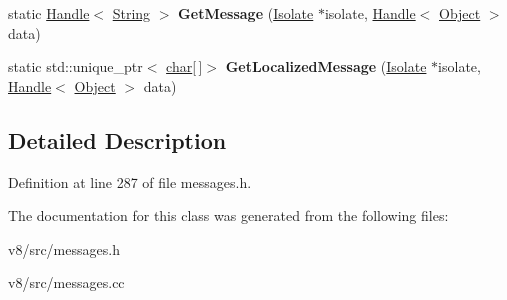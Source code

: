 \begin{DoxyCompactItemize}
\item 
\mbox{\label{classv8_1_1internal_1_1MessageHandler_a05c7290090b9628721213d335da8813c}} 
static \mbox{\hyperlink{classv8_1_1internal_1_1Handle}{Handle}}$<$ \mbox{\hyperlink{classv8_1_1internal_1_1String}{String}} $>$ {\bfseries Get\+Message} (\mbox{\hyperlink{classv8_1_1internal_1_1Isolate}{Isolate}} $\ast$isolate, \mbox{\hyperlink{classv8_1_1internal_1_1Handle}{Handle}}$<$ \mbox{\hyperlink{classv8_1_1internal_1_1Object}{Object}} $>$ data)
\item 
\mbox{\label{classv8_1_1internal_1_1MessageHandler_a05482b2f05e89e4a957a0811598c9025}} 
static std\+::unique\+\_\+ptr$<$ \mbox{\hyperlink{classchar}{char}}\mbox{[}$\,$\mbox{]}$>$ {\bfseries Get\+Localized\+Message} (\mbox{\hyperlink{classv8_1_1internal_1_1Isolate}{Isolate}} $\ast$isolate, \mbox{\hyperlink{classv8_1_1internal_1_1Handle}{Handle}}$<$ \mbox{\hyperlink{classv8_1_1internal_1_1Object}{Object}} $>$ data)
\end{DoxyCompactItemize}


\subsection{Detailed Description}


Definition at line 287 of file messages.\+h.



The documentation for this class was generated from the following files\+:\begin{DoxyCompactItemize}
\item 
v8/src/messages.\+h\item 
v8/src/messages.\+cc\end{DoxyCompactItemize}
